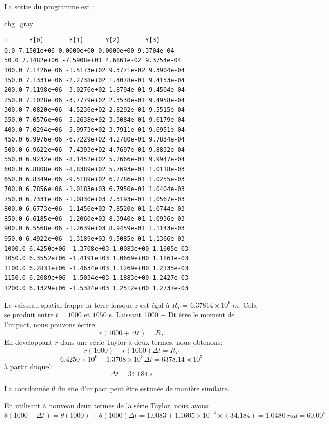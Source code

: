 \documentclass[%
oneside,                 %
final,                   %
10pt,french]{article}
\newenvironment{_cod_tight}[1]{
   \def\FrameCommand{\colorbox{#1}}
   \FrameRule0.6pt\MakeFramed {\FrameRestore}\vskip3mm}
   {\vskip0mm\endMakeFramed}
\newenvironment{cod}[1]{
\bgroup\rmfamily
\fboxsep=0mm\relax
\begin{_cod_tight}{#1}
\list{}{\parsep=-2mm\parskip=0mm\topsep=0pt\leftmargin=2mm
\rightmargin=2\leftmargin\leftmargin=4pt\relax}
\item\relax}
{\endlist\end{_cod_tight}\egroup}
\newenvironment{doconceexercise}{}{}
\begin{document}
\begin{doconceexercise}
La sortie du programme est :
\begin{cod}{cbg_gray}\begin{verbatim}
T      Y[0]       Y[1]      Y[2]       Y[3]
0.0 7.1501e+06 0.0000e+00 0.0000e+00 9.3704e-04
50.0 7.1482e+06 -7.5908e+01 4.6861e-02 9.3754e-04
100.0 7.1426e+06 -1.5173e+02 9.3771e-02 9.3904e-04
150.0 7.1331e+06 -2.2738e+02 1.4078e-01 9.4153e-04
200.0 7.1198e+06 -3.0276e+02 1.8794e-01 9.4504e-04
250.0 7.1028e+06 -3.7779e+02 2.3530e-01 9.4958e-04
300.0 7.0820e+06 -4.5236e+02 2.8292e-01 9.5515e-04
350.0 7.0576e+06 -5.2638e+02 3.3084e-01 9.6179e-04
400.0 7.0294e+06 -5.9973e+02 3.7911e-01 9.6951e-04
450.0 6.9976e+06 -6.7229e+02 4.2780e-01 9.7834e-04
500.0 6.9622e+06 -7.4393e+02 4.7697e-01 9.8832e-04
550.0 6.9232e+06 -8.1452e+02 5.2666e-01 9.9947e-04
600.0 6.8808e+06 -8.8389e+02 5.7693e-01 1.0118e-03
650.0 6.8349e+06 -9.5189e+02 6.2786e-01 1.0255e-03
700.0 6.7856e+06 -1.0183e+03 6.7950e-01 1.0404e-03
750.0 6.7331e+06 -1.0830e+03 7.3193e-01 1.0567e-03
800.0 6.6773e+06 -1.1456e+03 7.8520e-01 1.0744e-03
850.0 6.6185e+06 -1.2060e+03 8.3940e-01 1.0936e-03
900.0 6.5568e+06 -1.2639e+03 8.9459e-01 1.1143e-03
950.0 6.4922e+06 -1.3189e+03 9.5085e-01 1.1366e-03
1000.0 6.4250e+06 -1.3708e+03 1.0083e+00 1.1605e-03
1050.0 6.3552e+06 -1.4191e+03 1.0669e+00 1.1861e-03
1100.0 6.2831e+06 -1.4634e+03 1.1269e+00 1.2135e-03
1150.0 6.2089e+06 -1.5034e+03 1.1883e+00 1.2427e-03
1200.0 6.1329e+06 -1.5384e+03 1.2512e+00 1.2737e-03
\end{verbatim}
\end{cod}
\noindent
Le vaisseau spatial frappe la terre lorsque r est égal à $R_T = 6.37814 \times 10^6 \ m$. Cela se produit entre $t = 1000$ et $1050$ s.
Laissant 1000 + Dt être le moment de l'impact, nous pouvons écrire:
$$r(1000 + \Delta t ) = R_T$$
En développant $r$ dans une série Taylor à deux termes, nous obtenons:
$$r(1000) + \dot{r}(1000) \Delta t = R_T$$
$$6.4250 \times 10^6 - 1.3708 \times 10^3 \Delta t = 6378.14 \times 10^3 $$
à partir duquel:
$$\Delta t= 34.184 \ s$$

La coordonnée $\theta$ du site d'impact peut être estimée de manière similaire.

En utilisant à nouveau deux termes de la série Taylor, nous avons:
$$\theta (1000 + \Delta t ) = \theta (1000) + \dot{\theta} (1000) \Delta t = 1.0083 + 1.1605 \times 10^{-3} \times (34.184) = 1.0480 \ rad = 60.00^\circ$$




\end{doconceexercise}
\end{document}
